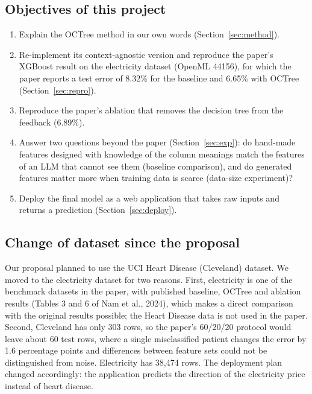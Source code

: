 \documentclass[11pt]{article}
\begin{document}
\subsection{Objectives of this project}
\begin{enumerate}
  \item Explain the OCTree method in our own words (Section~\ref{sec:method}).
  \item Re-implement its context-agnostic version and reproduce the paper's XGBoost result on the
        electricity dataset (OpenML 44156), for which the paper reports a test error of 8.32\% for
        the baseline and 6.65\% with OCTree (Section~\ref{sec:repro}).
  \item Reproduce the paper's ablation that removes the decision tree from the feedback (6.89\%).
  \item Answer two questions beyond the paper (Section~\ref{sec:exp}): do hand-made features
        designed with knowledge of the column meanings match the features of an LLM that cannot see
        them (baseline comparison), and do generated features matter more when training data is
        scarce (data-size experiment)?
  \item Deploy the final model as a web application that takes raw inputs and returns a prediction
        (Section~\ref{sec:deploy}).
\end{enumerate}

\subsection{Change of dataset since the proposal}
Our proposal planned to use the UCI Heart Disease (Cleveland) dataset. We moved to the electricity
dataset for two reasons. First, electricity is one of the benchmark datasets in the paper, with
published baseline, OCTree and ablation results (Tables 3 and 6 of Nam et al., 2024), which makes a
direct comparison with the original results possible; the Heart Disease data is not used in the
paper. Second, Cleveland has only 303 rows, so the paper's 60/20/20 protocol would leave about 60
test rows, where a single misclassified patient changes the error by 1.6 percentage points and
differences between feature sets could not be distinguished from noise. Electricity has 38,474 rows.
The deployment plan changed accordingly: the application predicts the direction of the electricity
price instead of heart disease.

\end{document}
